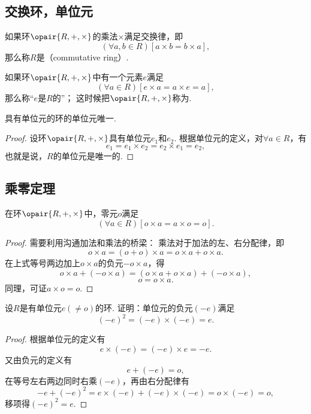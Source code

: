 \subsection{交换环，单位元}
\begin{definition}
如果环\(\opair{R,+,\times}\)的乘法\(\times\)满足交换律，即\[
	(\forall a,b \in R)[a \times b = b \times a],
\]
那么称\(R\)是（commutative ring）.
\end{definition}

\begin{definition}
如果环\(\opair{R,+,\times}\)中有一个元素\(e\)满足\[
	(\forall a \in R)[e \times a = a \times e = a],
\]
那么称“\(e\)是\(R\)的”；
这时候把\(\opair{R,+,\times}\)称为.
\end{definition}

\begin{property}
具有单位元的环的单位元唯一.
\begin{proof}
设环\(\opair{R,+,\times}\)具有单位元\(e_1\)和\(e_2\).
根据单位元的定义，对\(\forall a \in R\)，有\[
	e_1 = e_1 \times e_2 = e_2 \times e_1 = e_2,
\]
也就是说，\(R\)的单位元是唯一的.
\end{proof}
\end{property}

\subsection{乘零定理}
\begin{theorem}[乘零定理]
在环\(\opair{R,+,\times}\)中，零元\(o\)满足\[
	(\forall a \in R)[o \times a = a \times o = o].
\]
\begin{proof}
需要利用沟通加法和乘法的桥梁：
乘法对于加法的左、右分配律，即\[
	o \times a = (o + o) \times a = o \times a + o \times a.
\]在上式等号两边加上\(o \times a\)的负元\(-o \times a\)，得\[
	o \times a + (- o \times a) = (o \times a + o \times a) + (- o \times a),
\]\[
	o = o \times a.
\]
同理，可证\(a \times o = o\).
\end{proof}
\end{theorem}

\begin{example}
设\(R\)是有单位元\(e(\neq o)\)的环.
证明：单位元的负元\((-e)\)满足\[
	(-e)^2=(-e)\times(-e)=e.
\]
\begin{proof}
根据单位元的定义有\[
	e \times (-e) = (-e) \times e = -e.
\]
又由负元的定义有\[
	e + (-e) = o,
\]
在等号左右两边同时右乘\((-e)\)，再由右分配律有\[
	-e + (-e)^2 = e \times (-e) + (-e) \times (-e) = o \times (-e) = o,
\]
移项得\((-e)^2 = e\).
\end{proof}
\end{example}

